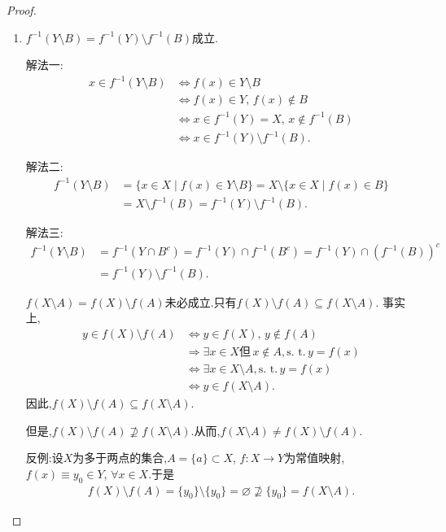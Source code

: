 \documentclass[../../main.tex]{subfiles}%
\begin{document}
\begin{proof}
\begin{enumerate}[(1)]
反之, 假设 $f$ 不是单射, 则存在 $x_1 \neq x_2$ 使得 $f(x_1) = f(x_2)$. 构造集合 $A = \{x_1\}$, 则 $f(A) = \{f(x_1)\}$. 故 $\{x_1, x_2\} \subseteq f^{-1}(f(A))$, 从而 $A \neq f^{-1}(f(A))$. 矛盾. 

\item  $f^{-1}(Y \setminus B) = f^{-1}(Y) \setminus f^{-1}(B)$成立.

{\color{blue}解法一:}
\begin{align*}
x \in f^{-1}(Y \setminus B) &\iff  f(x) \in Y \setminus B \\
&\iff  f(x) \in Y, \, f(x) \notin B \\
&\iff  x \in f^{-1}(Y) = X, \, x \notin f^{-1}(B) \\
&\iff  x \in f^{-1}(Y) \setminus f^{-1}(B).
\end{align*}

{\color{blue}解法二:}
\begin{align*}
f^{-1}(Y \setminus B) &= \{x \in X \mid f(x) \in Y \setminus B\} = X \setminus \{x \in X \mid f(x) \in B\} \\
&= X \setminus f^{-1}(B) = f^{-1}(Y) \setminus f^{-1}(B).
\end{align*}

{\color{blue}解法三:}
\begin{align*}
f^{-1}(Y \setminus B) &= f^{-1}(Y \cap B^c) = f^{-1}(Y) \cap f^{-1}(B^c) = f^{-1}(Y) \cap (f^{-1}(B))^c \\
&= f^{-1}(Y) \setminus f^{-1}(B).
\end{align*}

$f(X \setminus A) = f(X) \setminus f(A)$未必成立.只有$f(X) \setminus f(A) \subseteq f(X \setminus A)$.
事实上,
\begin{align*}
y \in f(X) \setminus f(A) &\iff  y \in f(X), \, y \notin f(A) \\
&\Rightarrow \exists x \in X \text{但} \, x \notin A, \text{s. t.} \, y = f(x) \\
&\iff  \exists x \in X \setminus A, \text{s. t.} \, y = f(x) \\
&\iff  y \in f(X \setminus A).
\end{align*}
因此,$f(X) \setminus f(A) \subseteq f(X \setminus A)$.

但是,$f(X) \setminus f(A) \nsupseteq f(X \setminus A)$.从而,$f(X \setminus A) \neq f(X) \setminus f(A)$.

反例:设$X$为多于两点的集合,$A = \{a\} \subset X$, $f: X \to Y$为常值映射,$f(x) \equiv y_0 \in Y$, $\forall x \in X$.于是
\begin{align*}
f(X) \setminus f(A) = \{y_0\} \setminus \{y_0\} = \varnothing \nsupseteq \{y_0\} = f(X \setminus A).
\end{align*}
\end{enumerate}
\end{proof}
\end{document}
